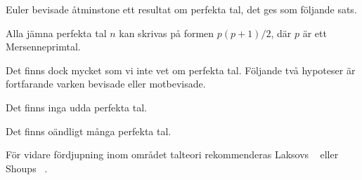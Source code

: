 Euler bevisade åtminstone ett resultat om perfekta tal, det ges som följande 
sats.
\begin{theorem}
  Alla jämna perfekta tal \(n\) kan skrivas på formen \(p(p + 1)/2\), där \(p\) 
  är ett Mersenneprimtal.
\end{theorem}
Det finns dock mycket som vi inte vet om perfekta tal.
Följande två hypoteser är fortfarande varken bevisade eller motbevisade.
\begin{conjecture}
  Det finns inga udda perfekta tal.
\end{conjecture}
\begin{conjecture}
  Det finns oändligt många perfekta tal.
\end{conjecture}

För vidare fördjupning inom området talteori rekommenderas
Laksovs ~\cite{Laksov2005kou} eller
Shoups ~\cite{ShoupNTB}.
